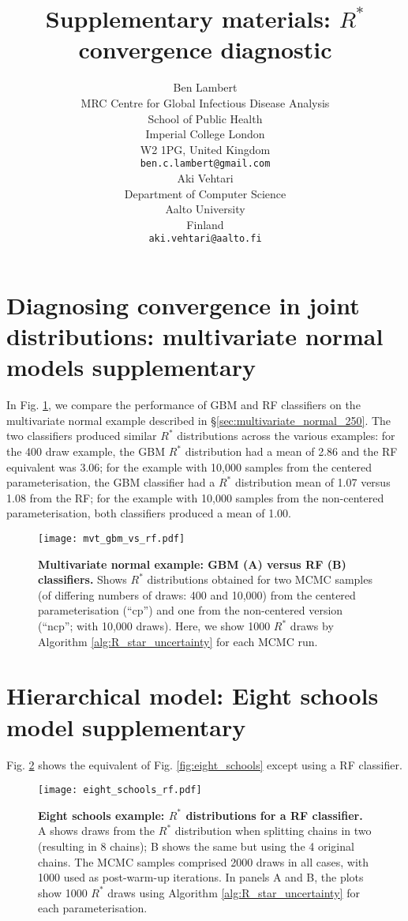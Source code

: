 \documentclass{article}
\title{Supplementary materials: $R^*$ convergence diagnostic}
\author{%
	Ben Lambert\\
	MRC Centre for Global Infectious Disease Analysis\\
	School of Public Health\\
	Imperial College London\\
	W2 1PG, United Kingdom\\
	\texttt{ben.c.lambert@gmail.com} \\
	\And
	Aki Vehtari \\
	Department of Computer Science\\
	Aalto University\\
	Finland\\
	\texttt{aki.vehtari@aalto.fi}
}
\begin{document}
	\maketitle

\color{red}
\section{Diagnosing convergence in joint distributions: multivariate normal models supplementary}\label{sec:multivariate_normal_supp}

In Fig. \ref{fig:mvt_gbm_vs_rf}, we compare the performance of GBM and RF classifiers on the multivariate normal example described in \S\ref{sec:multivariate_normal_250}. The two classifiers produced similar $R^*$ distributions across the various examples: for the 400 draw example, the GBM $R^*$ distribution had a mean of 2.86 and the RF equivalent was 3.06; for the example with 10,000 samples from the centered parameterisation, the GBM classifier had a $R^*$ distribution mean of 1.07 versus 1.08 from the RF; for the example with 10,000 samples from the non-centered parameterisation, both classifiers produced a mean of 1.00.

\begin{figure}[!htb]
	\centerline{\texttt{[image: mvt\_gbm\_vs\_rf.pdf]}}
	\caption{\textbf{Multivariate normal example: GBM (A) versus RF (B) classifiers.} Shows $R^*$ distributions obtained for two MCMC samples (of differing numbers of draws: 400 and 10,000) from the centered parameterisation (``cp'') and one from the non-centered version (``ncp''; with 10,000 draws). Here, we show 1000 $R^*$ draws by Algorithm \ref{alg:R_star_uncertainty} for each MCMC run.}
	\label{fig:mvt_gbm_vs_rf}
\end{figure}

\color{black}

\color{red}
\section{Hierarchical model: Eight schools model supplementary}\label{sec:8_schools_supp}

Fig. \ref{fig:eight_schools_rf} shows the equivalent of Fig. \ref{fig:eight_schools} except using a RF classifier.

\begin{figure}[!htb]
	\centerline{\texttt{[image: eight\_schools\_rf.pdf]}}
	\caption{\textbf{Eight schools example: $R^*$ distributions for a RF classifier.} A shows draws from the $R^*$ distribution when splitting chains in two (resulting in 8 chains); B shows the same but using the 4 original chains. The MCMC samples comprised 2000 draws in all cases, with 1000 used as post-warm-up iterations. In panels A and B, the plots show 1000 $R^*$ draws using Algorithm \ref{alg:R_star_uncertainty} for each parameterisation.}
	\label{fig:eight_schools_rf}
\end{figure}
\end{document}
